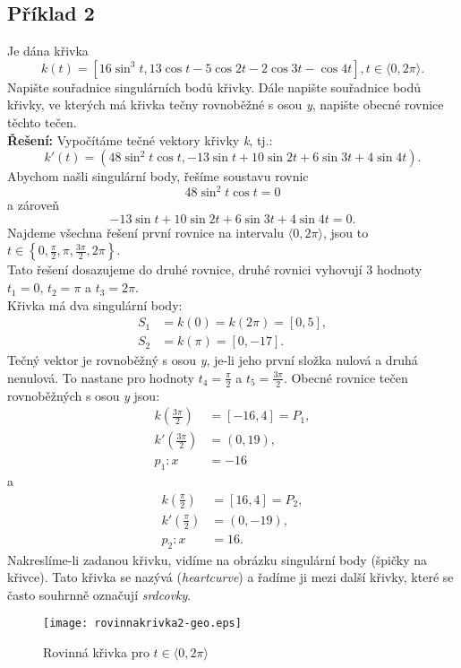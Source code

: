 	\subsection*{Příklad 2}
	Je dána křivka
	$$k(t) = [16\sin^3{t}, 13\cos{t}-5\cos{2t}-2\cos{3t}-\cos{4t}], t \in \langle0, 2\pi\rangle.$$
	Napište souřadnice singulárních bodů křivky. Dále napište souřadnice bodů křivky, ve kterých
	má křivka tečny rovnoběžné s osou \textit{y}, napište obecné rovnice těchto tečen. \\[10pt]
	\textbf{Řešení:} Vypočítáme tečné vektory křivky \textit{k}, tj.:
	$$k'(t) = (48\sin^2{t}\cos{t},-13\sin{t}+10\sin{2t}+6\sin{3t}+4\sin{4t}).$$
	Abychom našli singulární body, řešíme soustavu rovnic
	$$48\sin^2{t}\cos{t}=0$$
	a zároveň
	$$-13\sin{t}+10\sin{2t}+6\sin{3t}+4\sin{4t}=0.$$
	Najdeme všechna řešení první rovnice na intervalu $\langle0, 2\pi\rangle$, jsou to
	$t \in \left\{ 0, \frac{\pi}{2}, \pi, \frac{3\pi}{2}, 2\pi \right\}$. \\
	Tato řešení dosazujeme do druhé rovnice, druhé rovnici vyhovují 3 hodnoty
	$t_1=0$, $t_2=\pi$ a $t_3=2\pi$. \\
	Křivka má dva singulární body:
	\begin{align*}
		S_1 & = k(0) = k(2\pi)=[0, 5], \\
		S_2 & = k(\pi) = [0, -17].     
	\end{align*}
	Tečný vektor je rovnoběžný s osou \textit{y}, je-li jeho první složka nulová a druhá nenulová.
	To nastane pro hodnoty $t_4=\frac{\pi}{2}$ a $t_5=\frac{3\pi}{2}$.
	Obecné rovnice tečen rovnoběžných s osou \textit{y} jsou:
	\begin{align*}
		k\left(\frac{3\pi}{2}\right)  & = [-16,4] = P_1, \\
		k'\left(\frac{3\pi}{2}\right) & = (0, 19),       \\
		p_1: x                        & = -16            
	\end{align*}
	a
	\begin{align*}
		k\left(\frac{\pi}{2}\right)  & = [16,4] = P_2, \\
		k'\left(\frac{\pi}{2}\right) & = (0, -19),     \\
		p_2: x                       & = 16.           
	\end{align*}
	\clearpage
	\noindent Nakreslíme-li zadanou křivku, vidíme na obrázku singulární body (špičky na křivce). Tato křivka se nazývá  (\textit{heartcurve}) a řadíme ji mezi další křivky, které se často souhrnně označují \textit{srdcovky}.
	\begin{figure}[H]
		\centering
		\texttt{[image: rovinnakrivka2-geo.eps]}
		\caption{Rovinná křivka pro $t \in \langle0, 2\pi\rangle$}
		
	\end{figure}	